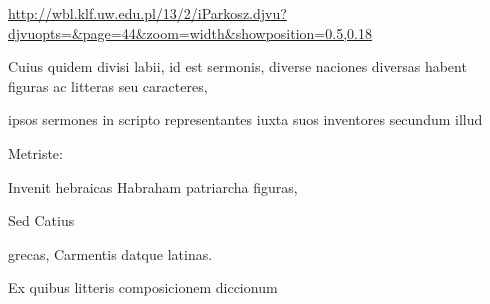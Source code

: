 \url{http://wbl.klf.uw.edu.pl/13/2/iParkosz.djvu?djvuopts=&page=44&zoom=width&showposition=0.5,0.18}


\begin{VerbatimLatin}[numbers=none,formatcom=\color{blue}]
Cuius quidem divisi labii, id est sermonis,
diverse naciones diversas habent figuras ac litteras seu caracteres,
\end{VerbatimLatin}

\renewcommand{\theFancyVerbLine}{04-0\arabic{FancyVerbLine}\phantom{a}}

\begin{VerbatimLatin}
ipsos sermones in scripto representantes iuxta suos inventores secundum illud
\end{VerbatimLatin}
\renewcommand{\theFancyVerbLine}{\textcolor{green}{04-11\alph{FancyVerbLine}}}
\begin{VerbatimLatin}[firstnumber=1]
Metriste:

\indentKcyt Invenit hebraicas Habraham patriarcha figuras,

\indentKcyt Sed Catius
\end{VerbatimLatin}
\renewcommand{\theFancyVerbLine}{\textcolor{green}{04-12\alph{FancyVerbLine}}}
\begin{VerbatimLatin}[firstnumber=1]
\indentKcyt \phantom{Sed Catius}grecas, Carmentis datque latinas.

\indentK Ex quibus litteris composicionem diccionum
\end{VerbatimLatin}

\renewcommand{\theFancyVerbLine}{04-\arabic{FancyVerbLine}\phantom{a}}

